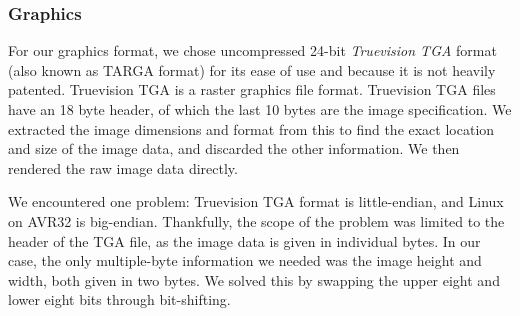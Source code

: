\subsubsection{Graphics}
For our graphics format, we chose uncompressed 24-bit \emph{Truevision TGA} format (also known as TARGA format) for its ease of use and because it is not heavily patented. Truevision TGA is a raster graphics file format. Truevision TGA files have an 18 byte header, of which the last 10 bytes are the image specification. We extracted the image dimensions and format from this to find the exact location and size of the image data, and discarded the other information. We then rendered the raw image data directly. %

We encountered one problem: Truevision TGA format is little-endian, and Linux on AVR32 is big-endian. Thankfully, the scope of the problem was limited to the header of the TGA file, as the image data is given in individual bytes. In our case, the only multiple-byte information we needed was the image height and width, both given in two bytes. We solved this by swapping the upper eight and lower eight bits through bit-shifting.